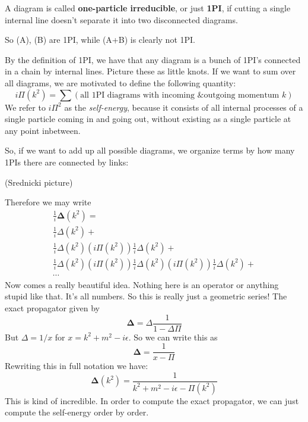 \documentclass{book}
\begin{document}
\begin{defn}
A diagram is called \textbf{one-particle irreducible}, or just \textbf{1PI}, if cutting a single internal line doesn't separate it into two disconnected diagrams.
\end{defn}
So (A), (B) are 1PI, while (A+B) is clearly not 1PI. 

By the definition of 1PI, we have that any diagram is a bunch of 1PI's connected in a chain by internal lines. Picture these as little knots. If we want to sum over all diagrams, we are motivated to define the following quantity:
\[
i\Pi(k^2) = \sum(\text{all 1PI diagrams with incoming \& outgoing momentum $k$})
\]
We refer to $i\Pi^2$ as the \textit{self-energy}, because it consists of all internal processes of a single particle coming in and going out, without existing as a single particle at any point inbetween.

So, if we want to add up all possible diagrams, we organize terms by how many 1PIs there are connected by links:

(Srednicki picture)

Therefore we may write
\begin{align}
&\frac{1}{i} \mathbf{\Delta} (k^2) = &\\ & \frac{1}{i}\Delta(k^2) +& \\ 
&\frac{1}{i}\Delta(k^2) (i \Pi(k^2)) \frac{1}{i}\Delta(k^2) + & \\ 
&\frac{1}{i}\Delta(k^2) (i\Pi(k^2)) \frac{1}{i}\Delta(k^2)  (i \Pi(k^2)) \frac{1}{i}\Delta(k^2) + & \\
&\cdots &
\end{align}
Now comes a really beautiful idea. Nothing here is an operator or anything stupid like that. It's all numbers. So this is really just a geometric series! The exact propagator  given by
\[
\mathbf{\Delta} = \Delta \frac{1}{1-\Delta\Pi}
\]
But $\Delta = 1/x$ for $x = k^2 + m^2 - i\epsilon$. So we can write this as 
\[
\mathbf{\Delta} = \frac{1}{x - \Pi}
\]
Rewriting this in full notation we have:
\begin{equation} \label{eq:wowgeo}
\mathbf{\Delta} (k^2) = \frac{1}{k^2 + m^2 - i\epsilon - \Pi(k^2)}
\end{equation}
This is kind of incredible. In order to compute the exact propagator, we can just compute the self-energy order by order.
\end{document}
